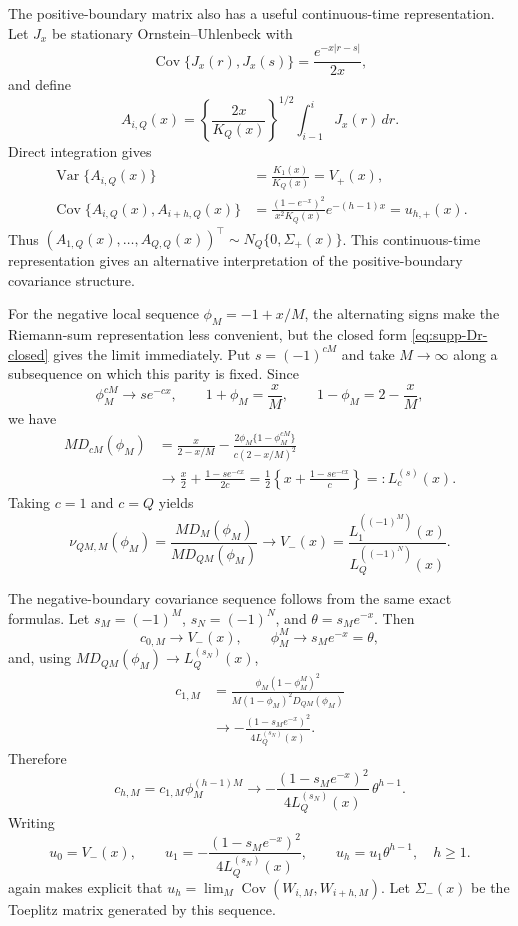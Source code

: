 \documentclass[12pt]{article}
\theoremstyle{remark}
\begin{document}
The positive-boundary matrix also has a useful continuous-time representation. Let $J_x$ be stationary Ornstein--Uhlenbeck with
\[
\operatorname{Cov}\{J_x(r),J_x(s)\}=\frac{e^{-x|r-s|}}{2x},
\]
and define
\[
A_{i,Q}(x)=\left\{\frac{2x}{K_Q(x)}\right\}^{1/2}
\int_{i-1}^{i}J_x(r)\,dr.
\]
Direct integration gives
\begin{align*}
\operatorname{Var}\{A_{i,Q}(x)\}
&=\frac{K_1(x)}{K_Q(x)}=V_+(x),\\
\operatorname{Cov}\{A_{i,Q}(x),A_{i+h,Q}(x)\}
&=\frac{(1-e^{-x})^2}{x^2K_Q(x)}e^{-(h-1)x}
=u_{h,+}(x).
\end{align*}
Thus $(A_{1,Q}(x),\ldots,A_{Q,Q}(x))^\top\sim N_Q\{0,\Sigma_+(x)\}$. This continuous-time representation gives an alternative interpretation of the positive-boundary covariance structure.

For the negative local sequence $\phi_M=-1+x/M$, the alternating signs make the Riemann-sum representation less convenient, but the closed form \eqref{eq:supp-Dr-closed} gives the limit immediately. Put $s=(-1)^{cM}$ and take $M\to\infty$ along a subsequence on which this parity is fixed. Since
\[
\phi_M^{cM}\longrightarrow s e^{-cx},
\qquad
1+\phi_M=\frac{x}{M},
\qquad
1-\phi_M=2-\frac{x}{M},
\]
we have
\begin{align*}
M D_{cM}(\phi_M)
&=\frac{x}{2-x/M}
-\frac{2\phi_M\{1-\phi_M^{cM}\}}
{c(2-x/M)^2} \\
&\longrightarrow
\frac{x}{2}+\frac{1-se^{-cx}}{2c}
=\frac12\left\{x+\frac{1-se^{-cx}}{c}\right\}
=:L_c^{(s)}(x).
\end{align*}
Taking $c=1$ and $c=Q$ yields
\begin{equation*}
\nu_{QM,M}(\phi_M)
=\frac{M D_M(\phi_M)}{M D_{QM}(\phi_M)}
\longrightarrow
V_-(x)=\frac{L_1^{((-1)^M)}(x)}{L_Q^{((-1)^N)}(x)}.
\end{equation*}

The negative-boundary covariance sequence follows from the same exact formulas. Let
$s_M=(-1)^M$, $s_N=(-1)^N$, and $\theta=s_Me^{-x}$. Then
\[
c_{0,M}\longrightarrow V_-(x),
\qquad
\phi_M^M\longrightarrow s_Me^{-x}=\theta,
\]
and, using $M D_{QM}(\phi_M)\to L_Q^{(s_N)}(x)$,
\begin{align*}
c_{1,M}
&=\frac{\phi_M(1-\phi_M^M)^2}
{M(1-\phi_M)^2D_{QM}(\phi_M)}\\
&\longrightarrow
-\frac{(1-s_Me^{-x})^2}{4L_Q^{(s_N)}(x)}.
\end{align*}
Therefore
\[
c_{h,M}=c_{1,M}\phi_M^{(h-1)M}
\longrightarrow
-\frac{(1-s_Me^{-x})^2}{4L_Q^{(s_N)}(x)}\,
\theta^{h-1}.
\]
Writing
\begin{equation*}
u_0=V_-(x),\qquad
u_1=-\frac{(1-s_Me^{-x})^2}{4L_Q^{(s_N)}(x)},\qquad
u_h=u_1\theta^{h-1},\quad h\ge1.
\end{equation*}
again makes explicit that $u_h=\lim_M\operatorname{Cov}(W_{i,M},W_{i+h,M})$. Let $\Sigma_-(x)$ be the Toeplitz matrix generated by this sequence.
\end{document}
